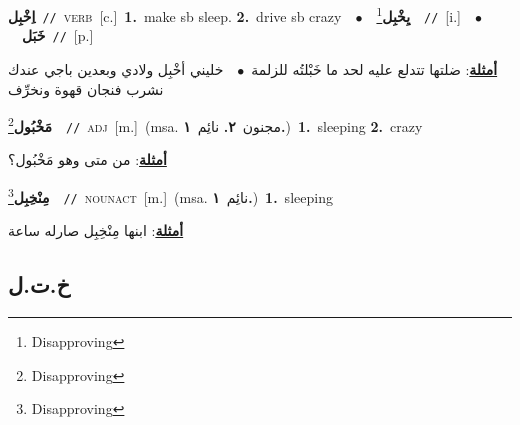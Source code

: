 \documentclass[10pt,a4paper,twoside]{article} %
\begin{document}
\begin{multicols}{2}
{{{\setlength\topsep{0pt}\textbf{\foreignlanguage{arabic}{اِخْبِل}}\ {\color{gray}\texttt{//}\color{black}}\ \textsc{verb}\ [c.]\ \textbf{1.}~make sb sleep.  \textbf{2.}~drive sb crazy\ \ $\bullet$\ \ \setlength\topsep{0pt}\textbf{\foreignlanguage{arabic}{يِخْبِل}}\footnote{Disapproving}\ \ {\color{gray}\texttt{//}\color{black}}\ [i.]\ \ $\bullet$\ \ \setlength\topsep{0pt}\textbf{\foreignlanguage{arabic}{خَبَل}}\ {\color{gray}\texttt{//}\color{black}}\ [p.]\  \begin{flushright}\color{gray}\foreignlanguage{arabic}{\textbf{\underline{\foreignlanguage{arabic}{أمثلة}}}: ضلتها تتدلع عليه لحد ما خَبْلتُه للزلمة\ $\bullet$\ \  خليني أخْبِل ولادي وبعدين باجي عندك نشرب فنجان قهوة ونخرِّف}\end{flushright}\color{black}} \vspace{2mm}

{\setlength\topsep{0pt}\textbf{\foreignlanguage{arabic}{مَخْبُول}}\footnote{Disapproving}\ \ {\color{gray}\texttt{//}\color{black}}\ \textsc{adj}\ [m.]\ \color{gray}(msa. \foreignlanguage{arabic}{مجنون}~\foreignlanguage{arabic}{\textbf{٢.}}  \foreignlanguage{arabic}{نائِم}~\foreignlanguage{arabic}{\textbf{١.}})\color{black}\ \textbf{1.}~sleeping  \textbf{2.}~crazy\  \begin{flushright}\color{gray}\foreignlanguage{arabic}{\textbf{\underline{\foreignlanguage{arabic}{أمثلة}}}: من متى وهو مَخْبُول؟}\end{flushright}\color{black}} \vspace{2mm}

{\setlength\topsep{0pt}\textbf{\foreignlanguage{arabic}{مِنْخِبِل}}\footnote{Disapproving}\ \ {\color{gray}\texttt{//}\color{black}}\ \textsc{noun\textunderscore act}\ [m.]\ \color{gray}(msa. \foreignlanguage{arabic}{نائِم}~\foreignlanguage{arabic}{\textbf{١.}})\color{black}\ \textbf{1.}~sleeping\  \begin{flushright}\color{gray}\foreignlanguage{arabic}{\textbf{\underline{\foreignlanguage{arabic}{أمثلة}}}: ابنها مِنْخِبِل صارله ساعة}\end{flushright}\color{black}} \vspace{2mm}

\vspace{-3mm}
\subsection*{\color{blue}\foreignlanguage{arabic}{خ.ت.ل}\color{blue}{}} 

}}
\end{multicols}
\end{document}
